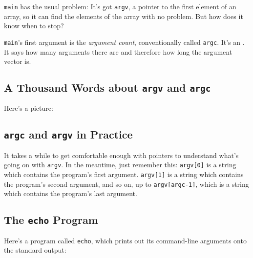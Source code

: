 {\tt main} has the usual problem: It's got {\tt argv}, a pointer to the
first element of an array, so it can find the elements of the array with
no problem.  But how does it know when to stop?

{\tt main}'s first argument is the {\em argument count}\/,
conventionally called {\tt argc}.  It's an \int.  It says how many
arguments there are and therefore how long the argument vector is.

\subsection{A Thousand Words about {\tt argv} and {\tt argc}}

Here's a picture:

\vspace{3in}

\subsection{{\tt argc} and {\tt argv} in Practice}

It takes a while to get comfortable enough with pointers to understand
what's going on with {\tt argv}.  In the meantime, just remember this:
{\tt argv[0]} is a string which contains the program's first argument.
{\tt argv[1]} is a string which contains the program's second argument,
and so on, up to {\tt argv[argc-1]}, which is a string which contains
the program's last argument.

\subsection{The {\tt echo} Program}

Here's a program called {\tt echo}, which prints out its command-line
arguments onto the standard output:



